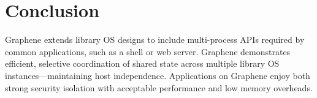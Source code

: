 \section{Conclusion}
\label{sec:conclusion}

Graphene extends library OS designs 
to include multi-process APIs required by common applications, such as a shell or 
web server.
Graphene demonstrates efficient, selective
coordination of shared state across multiple library OS 
instances---maintaining host independence.
Applications on Graphene enjoy both 
strong security isolation with acceptable performance and low memory overheads.




